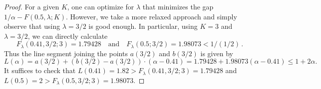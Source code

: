 \begin{proof}
        
        For a given $K$, one can optimize for $\lambda$ that minimizes the gap $1/\alpha - F(0.5, \lambda; K)$. 
        However, we take a more relaxed approach and simply observe that 
        using $\lambda = 3/2$ is good enough. 
        In particular, 
        using $K = 3$ and $\lambda = 3/2$, we can directly calculate 
        $$
        F_\lambda(0.41, 3/2; 3) = 1.79428
        \quad\text{and}\quad
        F_\lambda(0.5; 3/2) = 1.98073 < 1/(1/2)
        \,.
        $$
        Thus the line segment joining the points $a(3/2)$ and $b(3/2)$ 
        is given by 
        $$L(\alpha) 
        = a(3/2) + (b(3/2) - a(3/2))\cdot (\alpha - 0.41)
        = 1.79428 + 1.98073 (\alpha - 0.41)
        \leq 1 + 2 \alpha.
        $$
        It suffices to check that $L(0.41) = 1.82 > F_\lambda(0.41, 3/2; 3) = 1.79428$ and 
        $L(0.5) = 2 > F_\lambda(0.5, 3/2; 3) = 1.98073$.
    \end{proof}


